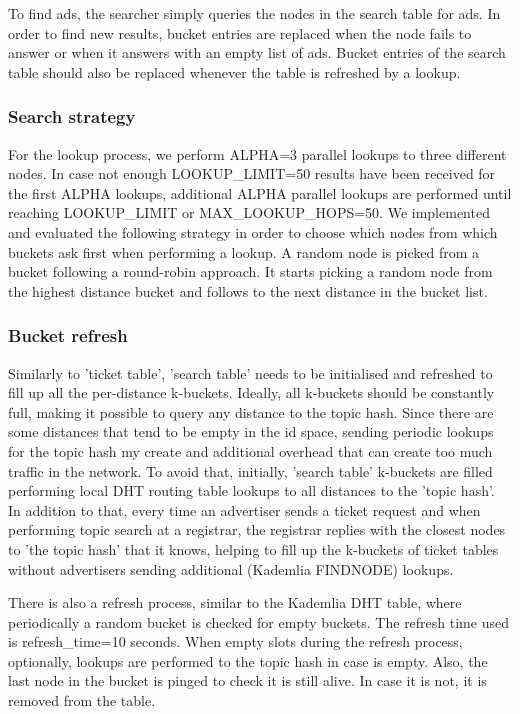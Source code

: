 To find ads, the searcher simply queries the nodes in the search table for ads. In order to find new results, bucket entries are replaced when the node fails to answer or when it answers with an empty list of ads. Bucket entries of the search table should also be replaced whenever the table is refreshed by a lookup.

\subsubsection{Search strategy}

For the lookup process, we perform ALPHA=3 parallel lookups to three different nodes. In case not enough LOOKUP\_LIMIT=50 results have been received for the first ALPHA lookups, additional ALPHA parallel lookups are performed until reaching LOOKUP\_LIMIT or MAX\_LOOKUP\_HOPS=50. We implemented and evaluated the following strategy in order to choose which nodes from which buckets ask first when performing a lookup. A random node is picked from a bucket following a round-robin approach. It starts picking a random node from the highest distance bucket and follows to the next distance in the bucket list.

\subsubsection{Bucket refresh}

Similarly to 'ticket table', 'search table' needs to be initialised and refreshed to fill up all the per-distance k-buckets. Ideally, all k-buckets should be constantly full, making it possible to query any distance to the topic hash. Since there are some distances that tend to be empty in the id space, sending periodic lookups for the topic hash my create and additional overhead that can create too much traffic in the network. To avoid that, initially, 'search table' k-buckets are filled performing local DHT routing table lookups to all distances to the 'topic hash'. In addition to that, every time an advertiser sends a ticket request and when performing topic search at a registrar, the registrar replies with the closest nodes to 'the topic hash' that it knows, helping to fill up the k-buckets of ticket tables without advertisers sending additional (Kademlia FINDNODE) lookups.

There is also a refresh process, similar to the Kademlia DHT table, where periodically a random bucket is checked for empty buckets. The refresh time used is refresh\_time=10 seconds. When empty slots during the refresh process, optionally, lookups are performed to the topic hash in case is empty. Also, the last node in the bucket is pinged to check it is still alive. In case it is not, it is removed from the table.